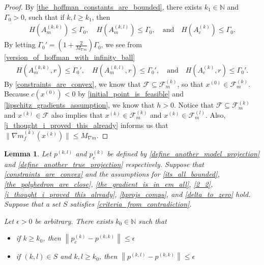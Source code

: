 \documentclass{article}
\newtheorem{lemma}[theorem]{Lemma}
\theoremstyle{case}
\numberwithin{theorem}{subsection}
\newcommand{\feasiblek}{{\mathcal F_m^{(k)}}}
\newcommand{\feasiblel}{{\mathcal F_m^{(l)}}}
\newcommand{\feasible}{{\mathcal F}}
\newcommand{\gk}{{\nabla m_f^{(k)}\left(\xk\right)}}
\newcommand{\huff}{{\Gamma_0}}
\newcommand{\naturals}{\mathbb N}
\newcommand{\xk}{x^{(k)}}
\newcommand{\xinit}{{x^{(0)}}}
\newcommand{\projkl}{{p^{(k,l)}}}
\newcommand{\projkk}{{p^{(k,k)}}}
\newcommand{\trueprojk}{{p_c^{(k)}}}
\newcommand{\maxmodelgrad}{{M_{\nabla m}}}
\begin{document}
\begin{proof}
By \cref{the_hoffman_constants_are_bounded}, there exists $k_1 \in \naturals$ and $\huff > 0$, such that if $k, l \ge k_1$, then 
\begin{align*}
H\left(A_{m}^{(k, k)}\right) \le \huff, \quad
H\left(A_{m}^{(k, l)}\right) \le \huff, 
\quad \textrm{and} \quad
H\left(A_{c}^{(k)}\right) \le \huff.
\end{align*}
By letting $\huff' = \left(1 + \frac 2 {\maxmodelgrad} \right) \huff$, we see from \cref{version_of_hoffman_with_infinity_ball}
\begin{align*}
H\left(A_{m}^{(k, k)}, r\right) \le \huff', \quad
H\left(A_{m}^{(k, l)}, r\right) \le \huff', 
\quad \textrm{and} \quad
H\left(A_{c}^{(k)}, r\right) \le \huff'.
\end{align*}
By \cref{constraints_are_convex}, we know that $\feasible \subseteq \feasiblek$, so that $\xinit \in \feasiblek$.
Because $c\left(\xinit\right) < 0$ by \cref{initial_point_is_feasible} and \cref{lipschitz_gradients_assumption}, we know that $h > 0$.
Notice that $\feasible \subseteq \feasiblek$ and $\xk \in \feasible$ also implies that
$\xk \in \feasiblek$ and $\xk \in \feasiblel$.
Also, \cref{i_thought_i_proved_this_already} informs us that $\|\gk\| \le \maxmodelgrad$.
\end{proof}


\begin{lemma}
\label{bounded_active_projection}
Let $\projkl$ and $\trueprojk$ be defined by \cref{define_another_model_projection} and \cref{define_another_true_projection} respectively.
Suppose that 
\cref{constraints_are_convex}
and the assumptions for
\cref{its_all_bounded}, \cref{the_polyhedron_are_close}, \cref{the_gradient_is_in_em_all}, \cref{2_2}, \cref{i_thought_i_proved_this_already}, \cref{bprojs_comps}, and \cref{delta_to_zero}
hold.
Suppose that a set $S$ satisfies \cref{criteria_from_contradiction}.

Let $\epsilon > 0$ be arbitrary.
There exists $k_0 \in \naturals$ such that 
\begin{itemize}
\item if $k \ge k_0$, then
$\left\| \trueprojk - \projkk \right\| \le \epsilon$
\item if $(k, l) \in S$ and $k,l \ge k_0$, then
$\left\| \projkl - \projkk \right\| \le \epsilon$
\end{itemize}
\end{lemma}
\end{document}
